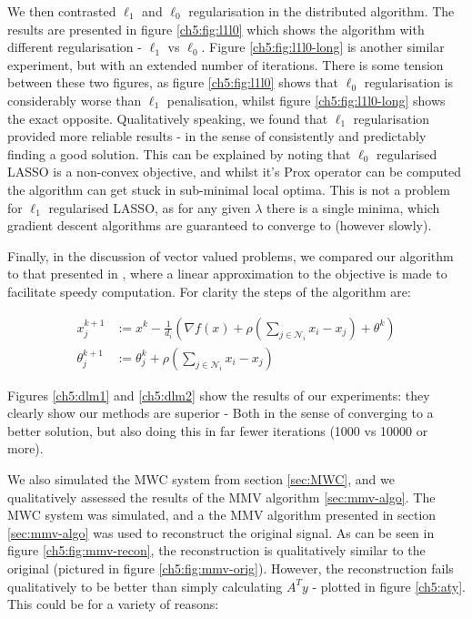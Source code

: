 We then contrasted \(\ell_1\) and \(\ell_0\) regularisation in the distributed algorithm. The results are presented in figure \ref{ch5:fig:l1l0} which shows the algorithm with different regularisation - \(\ell_1\) vs \(\ell_0\). Figure \ref{ch5:fig:l1l0-long} is another similar experiment, but with an extended number of iterations. There is some tension between these two figures, as figure \ref{ch5:fig:l1l0} shows that \(\ell_0\) regularisation is considerably worse than \(\ell_1\) penalisation, whilst figure \ref{ch5:fig:l1l0-long} shows the exact opposite. Qualitatively speaking, we found that \(\ell_1\) regularisation provided more reliable results - in the sense of consistently and predictably finding a good solution. This can be explained by noting that \(\ell_0\) regularised LASSO is a non-convex objective, and whilst it's Prox operator can be computed the algorithm can get stuck in sub-minimal local optima. This is not a problem for \(\ell_1\) regularised LASSO, as for any given \(\lambda\) there is a single minima, which gradient descent algorithms are guaranteed to converge to (however slowly). 

Finally, in the discussion of vector valued problems, we compared our algorithm to that presented in \cite{ling2015dlm}, where a linear approximation to the objective is made to facilitate speedy computation. For clarity the steps of the algorithm are:

\begin{thm}
\begin{align}
x_j^{k+1} &:= x^{k} - \frac{1}{d_i}\left(\nabla f(x) +\rho\left(\sum_{j \in \mathcal{N}_i} x_i - x_j \right) + \theta^k\right)\\
\theta_j^{k+1} &:= \theta_j^{k} + \rho \left(\sum_{j \in \mathcal{N}_i} x_i - x_j \right)
\label{dlm_algo}
\end{align}
\end{thm}

Figures \ref{ch5:dlm1} and \ref{ch5:dlm2} show the results of our experiments: they clearly show our methods are superior -  Both in the sense of converging to a better solution, but also doing this in far fewer iterations (1000 vs 10000 or more). 

We also simulated the MWC system from section \ref{sec:MWC}, and we qualitatively assessed the results of the MMV algorithm \ref{sec:mmv-algo}. The MWC system was simulated, and a the MMV algorithm presented in section \ref{sec:mmv-algo} was used to reconstruct the original signal. As can be seen in figure \ref{ch5:fig:mmv-recon}, the reconstruction is qualitatively similar to the original (pictured in figure \ref{ch5:fig:mmv-orig}). However, the reconstruction fails qualitatively to be better than simply calculating \(A^Ty\) - plotted in figure \ref{ch5:aty}. This could be for a variety of reasons:

